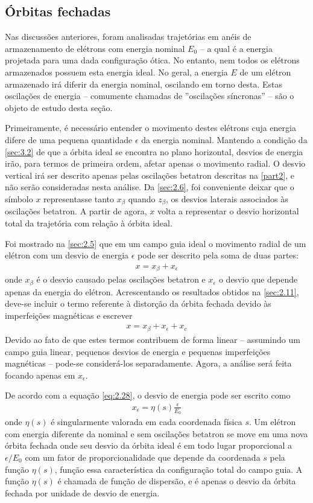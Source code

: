 \subsection{Órbitas fechadas}
Nas discussões anteriores, foram analisadas trajetórias em anéis de armazenamento de elétrons com energia nominal $E_0$ --  a qual é a energia projetada para uma dada configuração ótica. No entanto, nem todos os elétrons armazenados possuem esta energia ideal. No geral, a energia $E$ de um elétron armazenado irá diferir da energia nominal, oscilando em torno desta. Estas oscilações de energia -- comumente chamadas de ''oscilações síncronas'' -- são o objeto de estudo desta seção.

Primeiramente, é necessário entender o movimento destes elétrons cuja energia difere de uma pequena quantidade $\epsilon$ da energia nominal. Mantendo a condição da \autoref{sec:3.2} de que a órbita ideal se encontra no plano horizontal, desvios de energia irão, para termos de primeira ordem, afetar apenas o movimento radial. O desvio vertical irá ser descrito apenas pelas oscilações betatron descritas na \autoref{part2}, e não serão consideradas nesta análise. Da \autoref{sec:2.6}, foi conveniente deixar que o símbolo $x$ representasse tanto $x_\beta$ quando $z_\beta$, os desvios laterais associados às oscilações betatron. A partir de agora, $x$ volta a representar o desvio horizontal total da trajetória com relação à órbita ideal.

Foi mostrado na \autoref{sec:2.5} que em um campo guia ideal o movimento radial de um elétron com um desvio de energia $\epsilon$ pode ser descrito pela soma de duas partes:
\begin{align}
	x = x_\beta + x_\epsilon
\end{align}
onde $x_\beta$ é o desvio causado pelas oscilações betatron e $x_\epsilon$ o desvio que depende apenas da energia do elétron. Acrescentando os resultados obtidos na \autoref{sec:2.11}, deve-se incluir o termo referente à distorção da órbita fechada devido às imperfeições magnéticas e escrever
\begin{align}
	x = x_\beta + x_\epsilon + x_c
\end{align}
Devido ao fato de que estes termos contribuem de forma linear -- assumindo um campo guia linear, pequenos desvios de energia e pequenas imperfeições magnéticas -- pode-se considerá-los separadamente. Agora, a análise será feita focando apenas em $x_\epsilon$.

De acordo com a equação \eqref{eq:2.28}, o desvio de energia pode ser escrito como
\begin{align}
	x_\epsilon = \eta(s)\frac{\epsilon}{E_0}
\end{align}
onde $\eta(s)$ é singularmente valorada em cada coordenada física $s$. Um elétron com energia diferente da nominal e sem oscilações betatron se move em uma nova órbita fechada onde seu desvio da órbita ideal é em todo lugar proporcional a $\epsilon/E_0$ com um fator de proporcionalidade que depende da coordenada $s$ pela função $\eta(s)$, função essa característica da configuração total do campo guia. A função $\eta(s)$ é chamada de função de dispersão, e é apenas o desvio da órbita fechada por unidade de desvio de energia.

